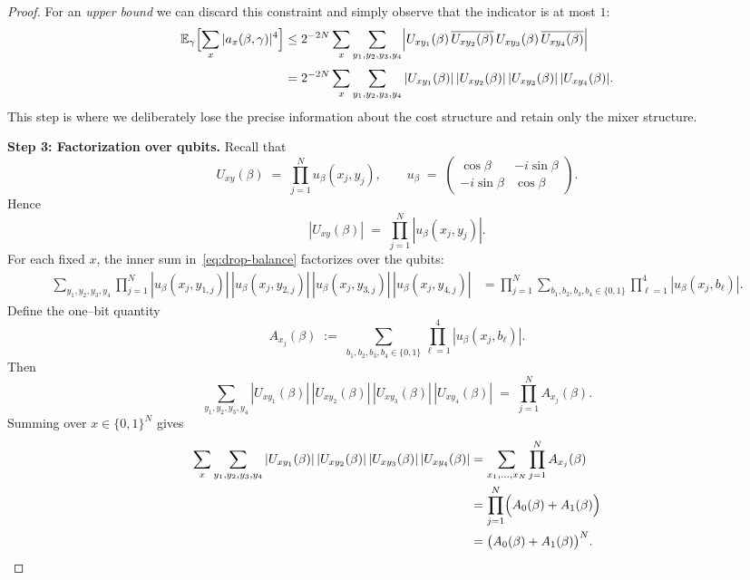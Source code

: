 \documentclass[a4paper,onecolumn,11pt,unpublished]{quantumarticle}
\theoremstyle{remark}
\begin{document}
\begin{proof}
For an \emph{upper bound} we can discard this constraint and simply observe that
the indicator is at most $1$:
\begin{align}
  \mathbb{E}_\gamma\Bigl[\sum_{x}|a_x(\beta,\gamma)|^4\Bigr]
  &\le
  2^{-2N}
  \sum_{x}
  \sum_{y_1,y_2,y_3,y_4}
  \Bigl|U_{xy_1}(\beta)\,\overline{U_{xy_2}(\beta)}\,
        U_{xy_3}(\beta)\,\overline{U_{xy_4}(\beta)}\Bigr|
  \nonumber\\[0.25em]
  &= 2^{-2N}
  \sum_{x}
  \sum_{y_1,y_2,y_3,y_4}
  |U_{xy_1}(\beta)|\,|U_{xy_2}(\beta)|\,
  |U_{xy_3}(\beta)|\,|U_{xy_4}(\beta)|.
  \label{eq:drop-balance}
\end{align}
This step is where we deliberately lose the precise information about the cost
structure and retain only the mixer structure.

\medskip
\noindent\textbf{Step 3: Factorization over qubits.}
Recall that
\[
  U_{xy}(\beta)
  \;=\;
  \prod_{j=1}^{N}
  u_\beta(x_j,y_j),
  \qquad
  u_\beta
  \;=\;
  \begin{pmatrix}
    \cos\beta & -i\sin\beta\\
    -i\sin\beta & \cos\beta
  \end{pmatrix}.
\]
Hence
\[
  |U_{xy}(\beta)|
  \;=\;
  \prod_{j=1}^{N}
  |u_\beta(x_j,y_j)|.
\]
For each fixed $x$, the inner sum in~\eqref{eq:drop-balance} factorizes over the
qubits:
\begin{align*}
  \sum_{y_1,y_2,y_3,y_4}
  \prod_{j=1}^{N}
  |u_\beta(x_j,y_{1,j})|\,
  |u_\beta(x_j,y_{2,j})|\,
  |u_\beta(x_j,y_{3,j})|\,
  |u_\beta(x_j,y_{4,j})|
  &= \prod_{j=1}^{N}
     \sum_{b_1,b_2,b_3,b_4\in\{0,1\}}
     \prod_{\ell=1}^{4}
     |u_\beta(x_j,b_\ell)|.
\end{align*}
Define the one–bit quantity
\[
  A_{x_j}(\beta)
  \;:=\;
  \sum_{b_1,b_2,b_3,b_4\in\{0,1\}}
  \prod_{\ell=1}^{4}
  |u_\beta(x_j,b_\ell)|.
\]
Then
\[
  \sum_{y_1,y_2,y_3,y_4}
  |U_{xy_1}(\beta)|\,|U_{xy_2}(\beta)|\,
  |U_{xy_3}(\beta)|\,|U_{xy_4}(\beta)|
  \;=\;
  \prod_{j=1}^{N} A_{x_j}(\beta).
\]
Summing over $x\in\{0,1\}^N$ gives
\begin{align}
  \sum_{x}
  \sum_{y_1,y_2,y_3,y_4}
  |U_{xy_1}(\beta)|\,|U_{xy_2}(\beta)|\,
  |U_{xy_3}(\beta)|\,|U_{xy_4}(\beta)|
  &= \sum_{x_1,\dots,x_N}
     \prod_{j=1}^{N} A_{x_j}(\beta)
     \nonumber\\
  &= \prod_{j=1}^{N}\Bigl(A_0(\beta)+A_1(\beta)\Bigr)
     \nonumber\\
  &= \bigl(A_0(\beta)+A_1(\beta)\bigr)^{N}.
  \label{eq:A-sum-factor}
\end{align}


\end{proof}
\end{document}
